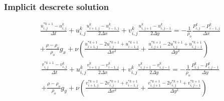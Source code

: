 \documentclass[xcolor=dvipsnames,10pt,aspectratio=169]{beamer}
\begin{document}
\begin{frame}
	\frametitle{Implicit descrete solution}
	\begin{equation}
		\begin{split}
		\frac{u_{i , j}^{\ast k + 1} - u_{i , j}^{k}}{\Delta t} + u_{i , j}^{k}\frac{u_{i + 1 , j}^k - u_{i - 1 , j}^k  }{2 \Delta x} + v_{i , j}^{k}\frac{u_{i , j+ 1}^k - u_{i, j-1}^k  }{2 \Delta y} =  -\frac{1}{\rho_o} \frac{P_{i, j}^k - P_{i - 1 , j}^k}{\Delta x} \\ + \frac{\rho - 	\rho_o}{\rho_o} g_x + \nu \left( \frac{u_{i+1 , j}^{\ast k + 1} - 2 u_{i,j}^{\ast k + 1} + u_{i-1,j}^{\ast k + 1}}{\Delta x^2} + \frac{u_{i , j+1}^{\ast k + 1} - 2 u_{i,j}^{\ast k + 1} + u_{i,j-1}^{\ast k + 1}}{\Delta y^2} \right)
		\end{split}
	\end{equation}
	\begin{equation}
		\begin{split}
		\frac{v_{i , j}^{\ast k + 1} - v_{i , j}^{k}}{\Delta t} + u_{i , j}^{k}\frac{v_{i + 1 , j}^k - v_{i - 1 , j}^k  }{2 \Delta x} + v_{i , j}^{k}\frac{v_{i , j+ 1}^k - v_{i, j-1}^k  }{2 \Delta y} =  -\frac{1}{\rho_o} \frac{P_{i , j}^k - P_{i , j - 1}^k}{\Delta y} \\ + \frac{\rho - \rho_o}{\rho_o} g_y + \nu \left( \frac{v_{i+1 , j}^{\ast k + 1} - 2 v_{i,j}^{\ast k + 1} + v_{i-1,j}^{\ast k + 1}}{\Delta x^2} + \frac{v_{i , j+1}^{\ast k + 1} - 2 v_{i,j}^{\ast k + 1} + v_{i,j-1}^{\ast k + 1}}{\Delta y^2} \right)
		\end{split}
	\end{equation}
\end{frame}
\end{document}
